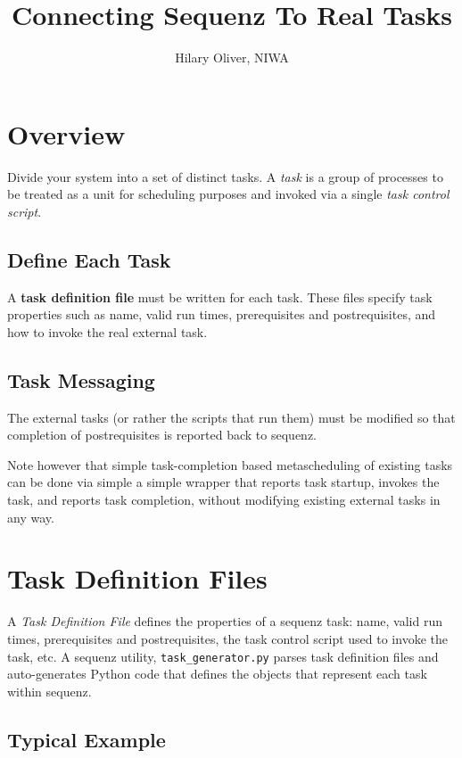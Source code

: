 \documentclass[11pt,a4paper]{article}
\title{Connecting Sequenz To Real Tasks}
\author{Hilary Oliver, NIWA}
\begin{document}
\maketitle
\tableofcontents

\section{Overview}

Divide your system into a set of distinct tasks. A {\em task} is a group
of processes to be treated as a unit for scheduling purposes and
invoked via a single {\em task control script}. 

\subsection{Define Each Task}

A \textbf{task definition file} must be written for each task. These
files specify task properties such as name, valid run times,
prerequisites and postrequisites, and how to invoke the real external
task.
    
\subsection{Task Messaging}

The external tasks (or rather the scripts that run them) must be 
modified so that completion of postrequisites is reported back to
sequenz. 

Note however that simple task-completion based metascheduling of
existing tasks can be done via simple a simple wrapper that reports task
startup, invokes the task, and reports task completion, without
modifying existing external tasks in any way.


\section{Task Definition Files}

A {\em Task Definition File} defines the properties of a sequenz task:
name, valid run times, prerequisites and postrequisites, the task
control script used to invoke the task, etc.  A sequenz utility,
\verb=task_generator.py= parses task definition files and auto-generates
Python code that defines the objects that represent each task within
sequenz.

\subsection{Typical Example}
\end{document}
